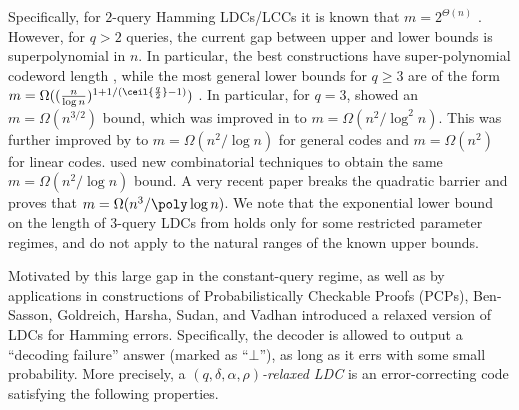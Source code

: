Specifically, for $2$-query Hamming LDCs/LCCs it is known that $m=2^{\Theta(n)}$ \cite{KerenidisW04, GoldreichKST06, Ben-AroyaRW08, bhattacharyya2017lower}. However, for $q>2$ queries, the current gap between upper and lower bounds is superpolynomial in $n$. In particular, the best constructions have super-polynomial codeword length \cite{Yekhanin08,DvirGY11,Efremenko12}, 
while the most general lower bounds for $q\geq 3$ are of the form $m=\Omega((\frac{n}{\log n})^{1+1/(\ceil{\frac{q}{2}}-1)})$ \cite{KatzT00,KerenidisW04}. In particular, for $q=3$, \cite{KatzT00} showed an $m=\Omega(n^{3/2})$ bound, which was improved in \cite{KerenidisW04} to $m=\Omega(n^2/\log^2 n)$. This was further improved by \cite{Woodruff07,Woodruff12} to $m=\Omega(n^2/\log n)$ for general codes and $m=\Omega(n^2)$ for linear codes. \cite{bhattacharyya2017lower} used new combinatorial techniques to obtain the same $m=\Omega(n^2/\log n)$ bound. A very recent paper \cite{AlrabiahGKM} breaks the quadratic barrier and proves that  $m=\Omega(n^3/\poly\log n)$.
 We note that the  exponential lower bound on the length of $3$-query LDCs  from \cite{GalM12}  holds only for some restricted parameter regimes, and do not apply to the natural ranges of the known upper bounds.

Motivated by this large gap in the constant-query regime, as well as by applications in constructions of Probabilistically Checkable Proofs (PCPs), Ben-Sasson, Goldreich, Harsha, Sudan, and Vadhan \cite{Ben-SassonGHSV06} introduced a relaxed version of LDCs for Hamming errors. Specifically, the decoder is allowed to output a ``decoding failure'' answer (marked as ``$\bot$''), as long as it errs with some small probability. More precisely,  a \emph{$(q,\delta, \alpha, \rho)$-relaxed LDC} is an error-correcting code satisfying the following properties.

